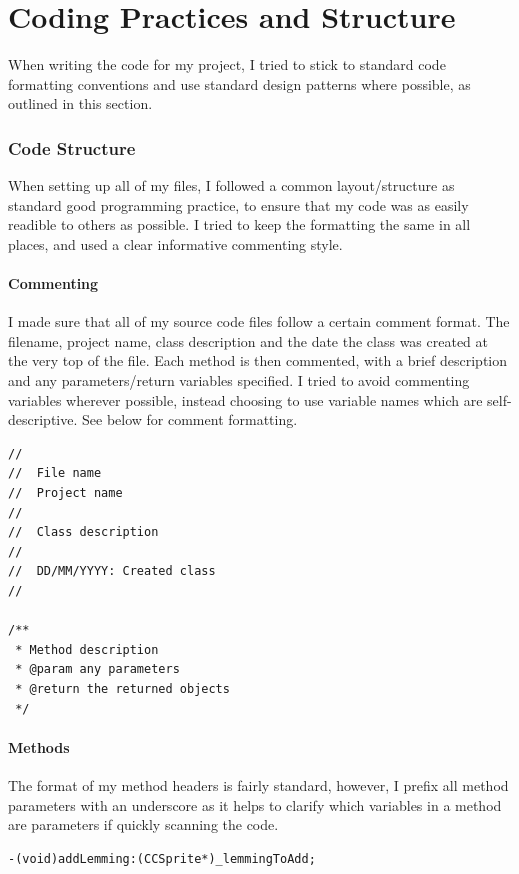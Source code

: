 \documentclass[a4paper,oneside]{report}
\begin{document}
\chapter{Coding Practices and Structure}

When writing the code for my project, I tried to stick to standard code formatting conventions and use standard design patterns where possible, as outlined in this section.

\subsection{Code Structure}

When setting up all of my files, I followed a common layout/structure as standard good programming practice, to ensure that my code was as easily readible to others as possible. I tried to keep the formatting the same in all places, and used a clear informative commenting style.

\subsubsection{Commenting}

I made sure that all of my source code files follow a certain comment format. The filename, project name, class description and the date the class was created at the very top of the file. Each method is then commented, with a brief description and any parameters/return variables specified. I tried to avoid commenting variables wherever possible, instead choosing to use variable names which are self-descriptive. See below for comment formatting.

\begin{lstlisting}
//
//  File name
//  Project name
//
//  Class description
//
//  DD/MM/YYYY: Created class
//

/**
 * Method description
 * @param any parameters
 * @return the returned objects
 */\end{lstlisting}

\subsubsection{Methods}

The format of my method headers is fairly standard, however, I prefix all method parameters with an underscore as it helps to clarify which variables in a method are parameters if quickly scanning the code.

\begin{lstlisting}
-(void)addLemming:(CCSprite*)_lemmingToAdd;
\end{lstlisting}
\end{document}
